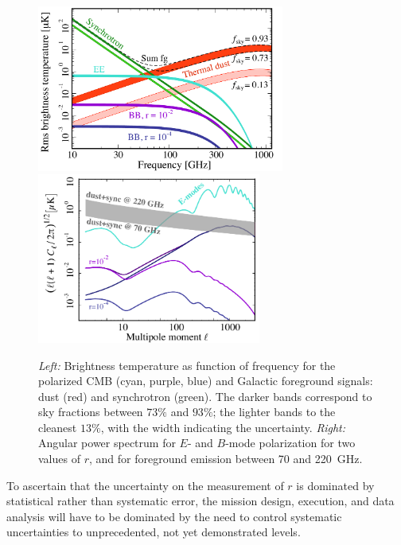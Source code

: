 \begin{figure}[ht!]
\vspace{-0.15in}
\hspace{-0.2in}
\begin{center}
\includegraphics[width=3.2in]{Figures/overview_pol_v4_fsky_noplanck.pdf}
\includegraphics[width=2.9in]{Figures/cmb_vs_foreground.pdf}
\end{center}
\vspace{-0.25in}
\caption{\small \setlength{\baselineskip}{0.95\baselineskip}
{\it Left:} Brightness temperature as function of frequency for the polarized CMB (cyan, purple, blue)
and Galactic foreground signals: dust (red) and synchrotron (green). The darker bands correspond to
sky fractions between $73\%$ and $93\%$; the lighter bands to the cleanest $13\%$, with the width 
indicating the uncertainty. {\it Right:} Angular power spectrum for $E$- and $B$-mode polarization 
for two values of $r$, and for foreground emission between 70 and 220~GHz.}
\label{fig:frequency}
\vspace{-0.05in}
\end{figure}

To ascertain that the uncertainty on the measurement of $r$ is dominated by statistical rather than 
systematic error, the mission design, execution, and data analysis will have to be dominated by the need
to control systematic uncertainties to unprecedented, not yet demonstrated levels. 

